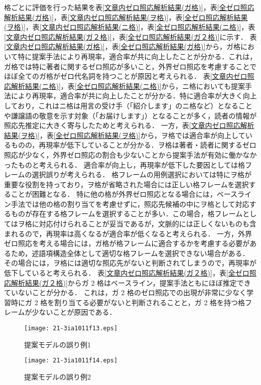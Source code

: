 \documentclass[japanese]{jnlp_1.4}
\begin{document}
格ごとに評価を行った結果を表\ref{文章内ゼロ照応解析結果(ガ格)}，表\ref{全ゼロ照応解析結果(ガ格)}，表\ref{文章内ゼロ照応解析結果(ヲ格)}，表\ref{全ゼロ照応解析結果(ヲ格)}，表\ref{文章内ゼロ照応解析結果(ニ格)}，表\ref{全ゼロ照応解析結果(ニ格)}，表\ref{文章内ゼロ照応解析結果(ガ２格)}，表\ref{全ゼロ照応解析結果(ガ２格)}に示す．
表\ref{文章内ゼロ照応解析結果(ガ格)}，表\ref{全ゼロ照応解析結果(ガ格)}から，ガ格において特に提案手法により再現率，適合率が共に向上したことが分かる．これは，ガ格では特に著者に関するゼロ照応が多いこと，外界ゼロ照応を考慮することでほぼ全てのガ格がゼロ代名詞を持つことが原因と考えられる．
表\ref{文章内ゼロ照応解析結果(ニ格)}，表\ref{全ゼロ照応解析結果(ニ格)}から，ニ格においても提案手法により再現率，適合率が共に向上したことが分かる．特に適合率が大きく向上しており，これはニ格は用言の受け手（「紹介します」のニ格など）となることや謙譲語の敬意を示す対象（「お届けします」）となることが多く，読者の情報が照応先推定に大きく寄与したためと考えられる．
一方，表\ref{文章内ゼロ照応解析結果(ヲ格)}，表\ref{全ゼロ照応解析結果(ヲ格)}から，ヲ格では適合率が向上しているものの，再現率が低下していることが分かる．ヲ格は著者・読者に関するゼロ照応が少なく，外界ゼロ照応の割合も少ないことから提案手法が有効に働かなかったものと考えられる．
適合率が向上し，再現率が低下した要因としては格フレームの選択誤りが考えられる．
格フレームの用例選択においては特にヲ格が重要な役割を持っており，ヲ格が省略された場合には正しい格フレームを選択することが困難となる．
特に他の格が外界ゼロ照応となる場合には，ベースライン手法では他の格の割り当てを考慮せずに，照応先候補の中にヲ格として対応するものが存在する格フレームを選択することが多い．この場合，格フレームとしてはヲ格に対応付けられることが妥当であるが，文脈的には正しくないものも含まれるので，再現率は高くなるが適合率が低くなると考えられる．
一方，外界ゼロ照応を考える場合には，ガ格が格フレームに適合するかを考慮する必要があるため，述語項構造全体として適切な格フレームを選択できない場合がある．
その場合には，ヲ格には適切な照応先がないと判断されてしまうので，再現率が低下していると考えられる．
表\ref{文章内ゼロ照応解析結果(ガ２格)}，表\ref{全ゼロ照応解析結果(ガ２格)}からガ 2 格はベースライン，提案手法ともにほぼ推定できていないことが分かる．
これは，ガ 2 格のゼロ照応での出現が非常に少なく学習時にガ 2 格を割り当てる必要がないと判断されることと，ガ 2 格を持つ格フレームが少ないことが原因である．

\begin{figure}[b]
\vspace{-0.5\Cvs}
\texttt{[image: 21-3ia1011f13.eps]}
\caption{提案モデルの誤り例1}
\label{提案モデルの誤り例1}
\end{figure}
\begin{figure}[b]
\texttt{[image: 21-3ia1011f14.eps]}
\caption{提案モデルの誤り例2}
\label{提案モデルの誤り例2}
\vspace{-0.5\Cvs}
\end{figure}
\end{document}

